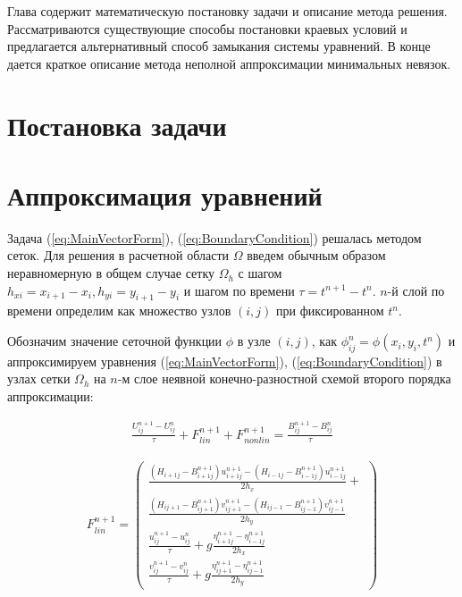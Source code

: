 Глава содержит математическую постановку задачи и описание метода решения. Рассматриваются существующие способы постановки краевых условий и предлагается альтернативный способ замыкания системы уравнений. В конце дается краткое описание метода неполной аппроксимации минимальных невязок.
\addtocounter{section}{1}
\setcounter{subsection}{0}
\setcounter{equation}{0}
\section*{Постановка задачи}


\newpage
\addtocounter{section}{1}
\setcounter{subsection}{0}
\setcounter{equation}{0}
\section*{Аппроксимация уравнений}

Задача (\ref{eq:MainVectorForm}), (\ref{eq:BoundaryCondition}) решалась методом сеток. Для решения в расчетной области $\Omega$ введем обычным образом неравномерную в общем случае сетку $\Omega_h$ с шагом $h_{x i}=x_{i+1}-x_{i},h_{y i}=y_{i+1}-y_{i}$ и шагом по времени $\tau=t^{n+1}-t^n$. $n$-й слой по времени определим как множество узлов $(i,j)$ при фиксированном $t^n$.

Обозначим значение сеточной функции $\phi$ в узле $(i,j)$, как $\phi^n_{ij}=\phi(x_i,y_i,t^n)$ и аппроксимируем уравнения (\ref{eq:MainVectorForm}), (\ref{eq:BoundaryCondition}) в узлах сетки $\Omega_h$ на $n$-м слое неявной конечно-разностной схемой второго порядка аппроксимации:

\begin{eqnarray}
    \label{eq:ApproxMainEq}
    \frac{U_{ij}^{n+1}-U_{ij}^{n}}{\tau}+F^{n+1}_{lin}+F^{n+1}_{nonlin}=\frac{B_{ij}^{n+1}-B_{ij}^{n}}{\tau}
\end{eqnarray}

\begin{eqnarray}
    \label{eq:ApproxFLin}
    F^{n+1}_{lin}=\begin{pmatrix}
	\frac{(H_{i+1j}-B_{i+1j}^{n+1})u_{i+1j}^{n+1}-(H_{i-1j}-B_{i-1j}^{n+1})u_{i-1j}^{n+1}}{2h_x}+\\
	\frac{(H_{ij+1}-B_{ij+1}^{n+1})v_{ij+1}^{n+1}-(H_{ij-1}-B_{ij-1}^{n+1})v_{ij-1}^{n+1}}{2h_y}\\
	\frac{u_{ij}^{n+1}-u_{ij}^{n}}{\tau}+
	g\frac{\eta_{i+1j}^{n+1}-\eta_{i-1j}^{n+1}}{2h_x}\\
	\frac{v_{ij}^{n+1}-v_{ij}^{n}}{\tau}+
	g\frac{\eta_{ij+1}^{n+1}-\eta_{ij-1}^{n+1}}{2h_y}
    \end{pmatrix}
\end{eqnarray}

